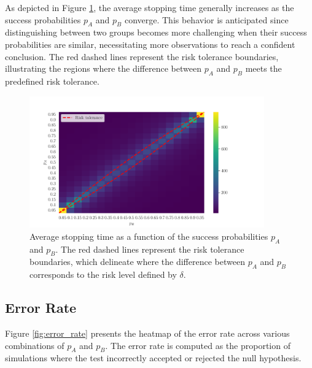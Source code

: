 \documentclass[magisterska, english]{pwr_wmat_praca_dyplomowa}
\theoremstyle{plain}
\numberwithin{theorem}{chapter}
\theoremstyle{definition}
\numberwithin{theorem}{chapter}
\begin{document}
As depicted in Figure \ref{fig:avg_stopping_time}, the average stopping time generally increases as the success probabilities \( p_A \) and \( p_B \) converge. This behavior is anticipated since distinguishing between two groups becomes more challenging when their success probabilities are similar, necessitating more observations to reach a confident conclusion. The red dashed lines represent the risk tolerance boundaries, illustrating the regions where the difference between \( p_A \) and \( p_B \) meets the predefined risk tolerance.
\begin{figure}[H]
	\centering
	\includegraphics[width=0.9\textwidth]{images/average_stopping_time_matrix.png}
	\caption{Average stopping time as a function of the success probabilities \( p_A \) and \( p_B \). The red dashed lines represent the risk tolerance boundaries, which delineate where the difference between \( p_A \) and \( p_B \) corresponds to the risk level defined by \( \delta \).}
	\label{fig:avg_stopping_time}
\end{figure}

\subsection{Error Rate}
Figure \ref{fig:error_rate} presents the heatmap of the error rate across various combinations of \( p_A \) and \( p_B \). The error rate is computed as the proportion of simulations where the test incorrectly accepted or rejected the null hypothesis.
\end{document}
